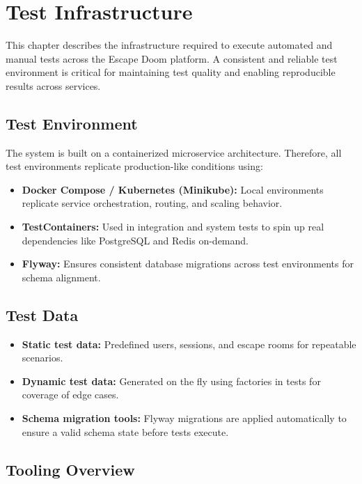 \section{Test Infrastructure}
\label{section-test-infrastructure}

This chapter describes the infrastructure required to execute automated and manual tests across the Escape Doom platform. A consistent and reliable test environment is critical for maintaining test quality and enabling reproducible results across services.

\subsection*{Test Environment}

The system is built on a containerized microservice architecture. Therefore, all test environments replicate production-like conditions using:

\begin{itemize}
    \item \textbf{Docker Compose / Kubernetes (Minikube):} Local environments replicate service orchestration, routing, and scaling behavior.
    \item \textbf{TestContainers:} Used in integration and system tests to spin up real dependencies like PostgreSQL and Redis on-demand.
    \item \textbf{Flyway:} Ensures consistent database migrations across test environments for schema alignment.
\end{itemize}

\subsection*{Test Data}

\begin{itemize}
    \item \textbf{Static test data:} Predefined users, sessions, and escape rooms for repeatable scenarios.
    \item \textbf{Dynamic test data:} Generated on the fly using factories in tests for coverage of edge cases.
    \item \textbf{Schema migration tools:} Flyway migrations are applied automatically to ensure a valid schema state before tests execute.
\end{itemize}

\subsection*{Tooling Overview}

